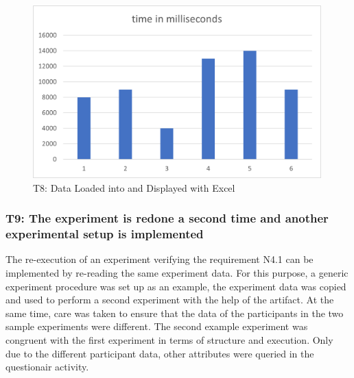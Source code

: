 \begin{figure}[htbp]
    \centering
    \includegraphics[width=0.99\textwidth, keepaspectratio]{content/07_evaluation_of_the_solution/ExcelPicture.png}
    \caption{T8: Data Loaded into and Displayed with Excel}    
    \label{fig:Excel}
\end{figure}

\newpage\subsubsection*{T9: The experiment is redone a second time and another experimental setup is implemented}

The re-execution of an experiment verifying the requirement N4.1 can be implemented by re-reading the same experiment data. For this purpose, a generic experiment procedure was set up as an example, the experiment data was copied and used to perform a second experiment with the help of the artifact. At the same time, care was taken to ensure that the data of the participants in the two sample experiments were different. The second example experiment was congruent with the first experiment in terms of structure and execution. Only due to the different participant data, other attributes were queried in the questionair activity.





